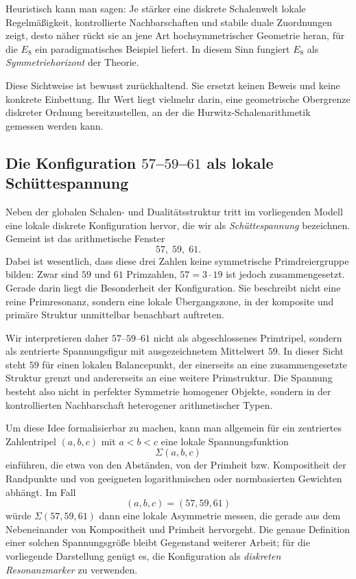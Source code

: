 \documentclass[a4paper,12pt]{article}
\theoremstyle{definition}
\numberwithin{equation}{section}
\begin{document}
	Heuristisch kann man sagen: Je stärker eine diskrete Schalenwelt lokale Regelmäßigkeit, kontrollierte Nachbarschaften und stabile duale Zuordnungen zeigt, desto näher rückt sie an jene Art hochsymmetrischer Geometrie heran, für die $E_8$ ein paradigmatisches Beispiel liefert. In diesem Sinn fungiert $E_8$ als \emph{Symmetriehorizont} der Theorie.
	
	Diese Sichtweise ist bewusst zurückhaltend. Sie ersetzt keinen Beweis und keine konkrete Einbettung. Ihr Wert liegt vielmehr darin, eine geometrische Obergrenze diskreter Ordnung bereitzustellen, an der die Hurwitz-Schalenarithmetik gemessen werden kann.
	
	\subsection{Die Konfiguration $57$--$59$--$61$ als lokale Schüttespannung}
	
	Neben der globalen Schalen- und Dualitätsstruktur tritt im vorliegenden Modell eine lokale diskrete Konfiguration hervor, die wir als \emph{Schüttespannung} bezeichnen. Gemeint ist das arithmetische Fenster
	\[
	57,\;59,\;61.
	\]
	Dabei ist wesentlich, dass diese drei Zahlen keine symmetrische Primdreiergruppe bilden: Zwar sind $59$ und $61$ Primzahlen, $57 = 3 \cdot 19$ ist jedoch zusammengesetzt. Gerade darin liegt die Besonderheit der Konfiguration. Sie beschreibt nicht eine reine Primresonanz, sondern eine lokale Übergangszone, in der komposite und primäre Struktur unmittelbar benachbart auftreten.
	
	Wir interpretieren daher $57$--$59$--$61$ nicht als abgeschlossenes Primtripel, sondern als zentrierte Spannungsfigur mit ausgezeichnetem Mittelwert $59$. In dieser Sicht steht $59$ für einen lokalen Balancepunkt, der einerseits an eine zusammengesetzte Struktur grenzt und andererseits an eine weitere Primstruktur. Die Spannung besteht also nicht in perfekter Symmetrie homogener Objekte, sondern in der kontrollierten Nachbarschaft heterogener arithmetischer Typen.
	
	Um diese Idee formalisierbar zu machen, kann man allgemein für ein zentriertes Zahlentripel $(a,b,c)$ mit $a<b<c$ eine lokale Spannungsfunktion
	\[
	\Sigma(a,b,c)
	\]
	einführen, die etwa von den Abständen, von der Primheit bzw. Kompositheit der Randpunkte und von geeigneten logarithmischen oder normbasierten Gewichten abhängt. Im Fall
	\[
	(a,b,c)=(57,59,61)
	\]
	würde $\Sigma(57,59,61)$ dann eine lokale Asymmetrie messen, die gerade aus dem Nebeneinander von Kompositheit und Primheit hervorgeht. Die genaue Definition einer solchen Spannungsgröße bleibt Gegenstand weiterer Arbeit; für die vorliegende Darstellung genügt es, die Konfiguration als \emph{diskreten Resonanzmarker} zu verwenden.
	
\end{document}
